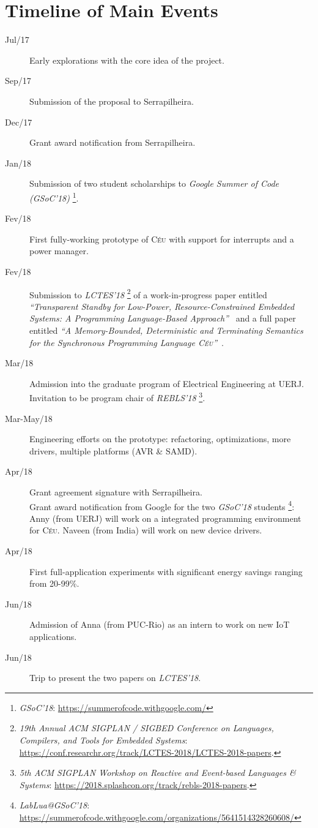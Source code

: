 \documentclass[12pt,english]{amsart}
\newcommand{\CEU}{\textsc{C\'{e}u}\xspace}
\begin{document}
\section{Timeline of Main Events}

\begin{description}
\item[Jul/17]
    Early explorations with the core idea of the project.
\item[Sep/17]
    Submission of the proposal to Serrapilheira.
\item[Dec/17]
    Grant award notification from Serrapilheira.
\item[Jan/18]
    Submission of two student scholarships to \emph{Google Summer of Code (GSoC'18)}%
    \footnote{\emph{GSoC'18}: \url{https://summerofcode.withgoogle.com/}}.
\item[Fev/18]
    First fully-working prototype of \CEU with support for interrupts and a
    power manager.
\item[Fev/18]
    Submission to \emph{LCTES'18} %
    \footnote {
        \emph{19th Annual ACM SIGPLAN / SIGBED Conference on Languages,
            Compilers, and Tools for Embedded Systems}:
        \url{https://conf.researchr.org/track/LCTES-2018/LCTES-2018-papers}.
    }
    of a work-in-progress paper entitled \emph{``Transparent Standby for
    Low-Power, Resource-Constrained Embedded Systems: A Programming
    Language-Based Approach''}~\cite{ceu.lctes18.short} and a full paper entitled \emph{``A
    Memory-Bounded, Deterministic and Terminating Semantics for the Synchronous
    Programming Language \CEU''}~\cite{ceu.lctes18}.
\item[Mar/18]
    Admission into the graduate program of Electrical Engineering at UERJ.
    \\
    Invitation to be program chair of \emph{REBLS'18} %
    \footnote {
        \emph{5th ACM SIGPLAN Workshop on Reactive and Event-based Languages \& Systems}:
        \url{https://2018.splashcon.org/track/rebls-2018-papers}.
    }.
\item[Mar-May/18]
    Engineering efforts on the prototype: refactoring, optimizations, more
    drivers, multiple platforms (AVR \& SAMD).
\item[Apr/18]
    Grant agreement signature with Serrapilheira.
    \\
    Grant award notification from Google for the two \emph{GSoC'18} students%
    \footnote{\emph{LabLua@GSoC'18}: \url{https://summerofcode.withgoogle.com/organizations/5641514328260608/}}:
    Anny (from UERJ) will work on a integrated programming environment for \CEU.
    Naveen (from India) will work on new device drivers.
\item[Apr/18]
    First full-application experiments with significant energy savings ranging
    from 20-99\%.
\item[Jun/18]
    Admission of Anna (from PUC-Rio) as an intern to work on new IoT
    applications.
\item[Jun/18]
    Trip to present the two papers on \emph{LCTES'18}.
\end{description}
\end{document}
